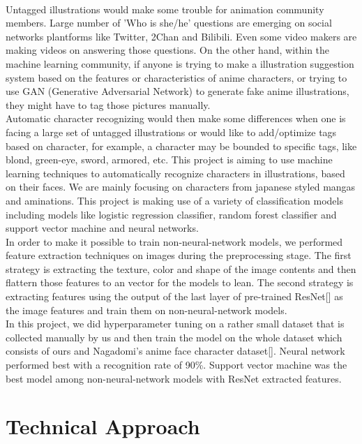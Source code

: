 \documentclass[11.5pt]{article}
\begin{document}
    \\ 
    Untagged illustrations would make some trouble for animation community members.
    Large number of 'Who is she/he' questions are emerging on social networks plantforms like Twitter, 2Chan and Bilibili.
    Even some video makers are making videos on answering those questions.
    On the other hand, within the machine learning community, if anyone is trying to make a illustration suggestion system based on the features or characteristics of anime characters, or trying to use GAN (Generative Adversarial Network) to generate fake anime illustrations, they might have to tag those pictures manually.\\ 
    Automatic character recognizing would then make some differences when one is facing a large set of untagged illustrations or would like to add/optimize tags based on character, for example, a character may be bounded to specific tags, like blond, green-eye, sword, armored, etc.
    This project is aiming to use machine learning techniques to automatically recognize characters in illustrations, based on their faces. We are mainly focusing on characters from japanese styled mangas and aminations. This project is making use of a variety of classification models including models like logistic regression classifier, random forest classifier and support vector machine and neural networks.\\ 
    In order to make it possible to train non-neural-network models, we performed feature extraction techniques on images during the preprocessing stage. The first strategy is extracting the texture, color and shape of the image contents and then flattern those features to an vector for the models to lean. The second strategy is extracting features using the output of the last layer of pre-trained ResNet[] as the image features and train them on non-neural-network models.\\ 
    In this project, we did hyperparameter tuning on a rather small dataset that is collected manually by us and then train the model on the whole dataset which consists of ours and Nagadomi's anime face character dataset[]. Neural network performed best with a recognition rate of 90\%. Support vector machine was the best model among non-neural-network models with ResNet extracted features. 


    \section{Technical Approach}
\end{document}
